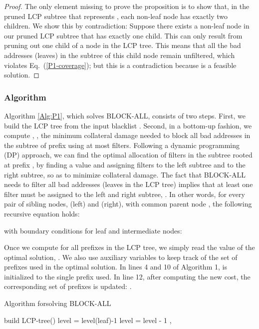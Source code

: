 \begin{proof}
The only element missing to prove the proposition is to show that, in the pruned LCP subtree that represents ,
each non-leaf node has exactly two children.
We show this by contradiction:
Suppose there exists a non-leaf node in our pruned LCP subtree that has exactly one child.
This can only result from pruning out one child of a node in the LCP tree.
This means that all the bad addresses (leaves) in the subtree of this child node remain unfiltered, which violates Eq.~(\ref{P1-coverage}); but this is a contradiction because   is a feasible solution.
\end{proof}







\subsubsection*{Algorithm} Algorithm \ref{Alg:P1}, which solves BLOCK-ALL, consists of two steps. First, we build the LCP tree from the input
blacklist . Second, in a bottom-up fashion, we compute , \ie, the minimum collateral damage needed to block all
bad addresses in the subtree of prefix  using at most  filters.
Following a dynamic programming (DP) approach,  we can find the optimal allocation of filters in the subtree rooted at prefix ,
by finding a value  and assigning  filters to the left subtree and  to the right subtree, so as to minimize collateral damage.
The fact that BLOCK-ALL needs to filter all bad addresses (leaves in the LCP tree) implies that at least one filter must be assigned to the left
and right subtree, \ie .
In other words, for every pair of sibling nodes,  (left) and  (right), with common parent node ,  the following recursive equation holds:

with boundary conditions for leaf and intermediate nodes:

Once we compute  for all prefixes in the LCP tree, we simply read the value of the optimal solution, .
We also use auxiliary variables  to keep track of the set of prefixes used in the optimal solution.
In lines 4 and 10 of Algorithm 1,   is initialized to the single prefix used.
In line 12, after computing the new cost, the corresponding set of prefixes is updated: .


\begin{algorithm}[t!]
 \caption{\label{Alg:P1} Algorithm forsolving  BLOCK-ALL}
\begin{algorithmic}[1]
\begin{footnotesize}
\STATE build LCP-tree()
	\STATE{  }
	\STATE{ }
\ENDFOR
\STATE level = level(leaf)-1
\WHILE{} \label{line:while}
	\STATE 
	\STATE 
	\STATE 
   	\STATE 
    \ENDFOR
    \STATE level = level - 1
\ENDWHILE
\RETURN , 
\end{footnotesize}
\end{algorithmic}
\end{algorithm}


